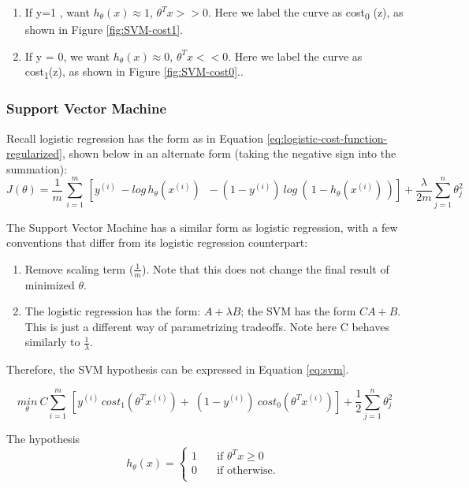         \begin{enumerate}
            \item If y=1 , want $h_\theta(x) \approx 1$, $\theta^T x >> 0$. Here we label the curve as cost\textsubscript{0} (z), as shown in Figure \ref{fig:SVM-cost1}.
            \item If y = 0, we want $h_\theta(x) \approx 0$, $\theta^T x << 0$. Here we label the curve as cost\textsubscript{1}(z), as shown in Figure \ref{fig:SVM-cost0}..
        \end{enumerate}

        \subsubsection{Support Vector Machine}
        Recall logistic regression has the form as in Equation \ref{eq:logistic-cost-function-regularized}, shown below in an alternate form (taking the negative sign into the summation):
    \[
J(\theta) = \frac{1}{m} \, \sum_{i=1}^{m}\, [ y^{(i)}\, -log\, h_\theta (x^{(i)})\; \; -(1-y^{(i)})\: log\:(\,1-h_\theta(x^{(i)})\,) ] + \frac{\lambda}{2m} \sum_{j=1}^{n} \theta_j^2
    \] 

    The Support Vector Machine has a similar form as logistic regression, with a few conventions that differ from its logistic regression counterpart:
    \begin{enumerate}
        \item Remove scaling term ($\frac{1}{m}$). Note that this does not change the final result of minimized $\theta$.
        \item The logistic regression has the form: $A + \lambda B$; the SVM has the form $CA + B$. This is just a different way of parametrizing tradeoffs. Note here C behaves similarly to $\frac{1}{\lambda}$.
    \end{enumerate}

    Therefore, the SVM hypothesis can be expressed in Equation \ref{eq:svm}.

    \begin{equation}
        \underset{\theta}{min}\: C \sum_{i=1}^{m}\, [ y^{(i)}\, cost_1 (\theta^T x^{(i)}) + \; (1-y^{(i)})\:cost_0 (\theta^T x^{(i)})] + \frac{1}{2} \sum_{j=1}^{n} \theta_j^2
        \label{eq:svm}
    \end{equation}

    The hypothesis
    \[
        h_\theta (x) = 
        \begin{cases}
       1 &\quad \text{if } \theta^T x \geq 0 \\
       0 &\quad \text{if otherwise. }  \\
        \end{cases}
    \]


